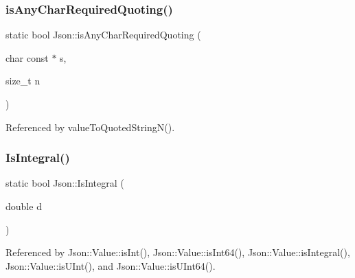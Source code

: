 \mbox{\label{namespaceJson_ae281325b4cbb7c2127c1ac90172261b5_ae281325b4cbb7c2127c1ac90172261b5}} 
\subsubsection{\texorpdfstring{is\+Any\+Char\+Required\+Quoting()}{isAnyCharRequiredQuoting()}}
{\footnotesize\ttfamily static bool Json\+::is\+Any\+Char\+Required\+Quoting (\begin{DoxyParamCaption}\item[{char const $\ast$}]{s,  }\item[{size\+\_\+t}]{n }\end{DoxyParamCaption})\hspace{0.3cm}{\ttfamily [static]}}



Referenced by value\+To\+Quoted\+String\+N().

\mbox{\label{namespaceJson_a1a04cc9d31e64b5912dade003c9b99b5_a1a04cc9d31e64b5912dade003c9b99b5}} 
\subsubsection{\texorpdfstring{Is\+Integral()}{IsIntegral()}}
{\footnotesize\ttfamily static bool Json\+::\+Is\+Integral (\begin{DoxyParamCaption}\item[{double}]{d }\end{DoxyParamCaption})\hspace{0.3cm}{\ttfamily [static]}}



Referenced by Json\+::\+Value\+::is\+Int(), Json\+::\+Value\+::is\+Int64(), Json\+::\+Value\+::is\+Integral(), Json\+::\+Value\+::is\+U\+Int(), and Json\+::\+Value\+::is\+U\+Int64().

\mbox{\label{namespaceJson_a61b556ffe4c70c4492a9dbe4718ec50b_a61b556ffe4c70c4492a9dbe4718ec50b}} 
